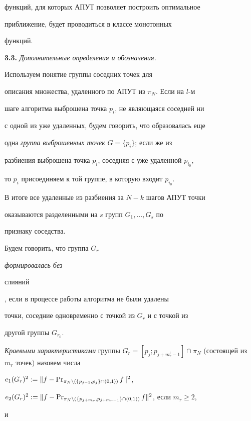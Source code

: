 функций, для которых АПУТ позволяет построить оптимальное


приближение, будет проводиться в классе монотонных


функций.


\medskip





{\bf 3.3.} {\it Дополнительные определения и обозначения.}


Используем понятие группы соседних точек для


описания множества, удаленного по АПУТ из $\pi_N$. Если на $l$-м


шаге алгоритма выброшена точка $p_i$, не являющаяся соседней ни


с одной из уже удаленных, будем говорить, что образовалась еще


одна {\it группа выброшенных точек} $G=\{p_i\}$; если же из


разбиения выброшена точка $p_i$, соседняя с уже удаленной $p_{i_0}$,


то $p_i$ присоединяем к той группе, в которую входит $p_{i_0}$.





В итоге все удаленные из разбиения за $N-k$ шагов АПУТ точки


оказываются разделенными на $s$ групп $G_1,\dotsc,G_s$ по


признаку соседства.





Будем говорить, что группа $G_r$ {\it формировалась без


слияний}, если в процессе работы алгоритма не были удалены


точки, соседние одновременно с точкой из $G_r$ и с точкой из


другой группы $G_{r_0}$.





{\it Краевыми характеристиками} группы $G_r=[p_j;p_{j+m_r^l-1}]\cap


\pi_N$ (состоящей из $m_r$ точек) назовем числа


$e_1(G_r)^2:=\|f-\operatorname{Pr}_{\pi_N\setminus(\{p_{j-1},p_j\}\cap(0,1))}f\|^2$,


$e_2(G_r)^2:=\|f-\PR_{\pi_N\setminus(\{p_{j+m_r},p_{j+m_r-1}\}


\cap(0,1))}f\|^2$, если $m_r\geq2$,


и


